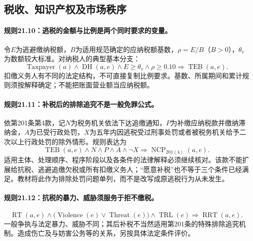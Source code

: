 \subsection{税收、知识产权及市场秩序}
\paragraph{规则21.10：逃税的金额与比例是两个同时要求的变量。}
令$E$为逃避缴纳税额，$B$为适用规范确定的应纳税额基数，$\rho=E/B$（$B>0$），$\theta_v$为数额较大标准。对纳税人的典型基本分支：
\[
\operatorname{Taxpayer}(a)\land\operatorname{DH}(a,e)
\land E\geq\theta_v\land\rho\geq0.10
\Rightarrow\operatorname{TEB}(a,e).
\]
扣缴义务人有不同的法定结构，不可直接复制比例要求。基数、所属期间和累计规则须按解释确定；不能把账面营业额当应纳税额。

\paragraph{规则21.11：补税后的排除追究不是一般免罪公式。}
依第201条第4款，记$N$为税务机关依法下达追缴通知，$P$为补缴应纳税款并缴纳滞纳金，$A$为已受行政处罚，$X$为五年内因逃税受过刑事处罚或者被税务机关给予二次以上行政处罚的除外情形。规则表达为
\[
\operatorname{TEB}(a,e)\land N\land P\land A\land\neg X
\Rightarrow\operatorname{NCP}_{201(4)}(a,e).
\]
适用主体、处理顺序、程序阶段以及各条件的法律解释必须继续核对。该款不能扩展给抗税、逃避追缴欠税或所有扣缴义务人；“愿意补税”也不等于三个条件已经满足。教材将此作为排除处罚问题单列，而不是改写成原逃税行为从未发生。

\paragraph{规则21.12：抗税的暴力、威胁须服务于拒不缴税。}
\[
\operatorname{RT}(a,e)\land
\bigl(\operatorname{Violence}(e)\lor\operatorname{Threat}(e)\bigr)
\land\operatorname{TRL}(e)
\Rightarrow\operatorname{RRT}(a,e).
\]
一般争执与法定暴力、威胁不同；其后补税不当然适用第201条的特殊排除追究机制。造成伤亡及与妨害公务等的关系，另按具体法定条件评价。

